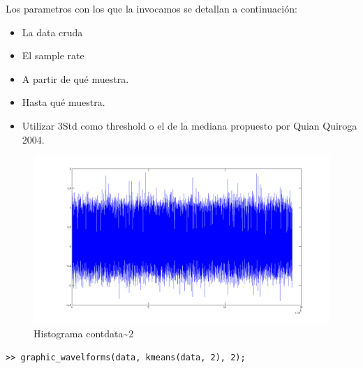 \documentclass[a4paper,spanish]{article}
\begin{document}
Los parametros con los que la invocamos se detallan a continuaci\'on:
\begin{itemize}
	\item La data cruda
	\item El sample rate
	\item A partir de qu\'e muestra.
	\item Hasta qu\'e muestra.
	\item Utilizar 3Std como threshold o el de la mediana propuesto por Quian Quiroga 2004.
\end{itemize}

\begin{figure}[htc]
	\centering
	\includegraphics[width=1.0\textwidth]{imgs/raw_cont_data.png}
	\caption{Histograma contdata\sim2}
	\label{fig5}
\end{figure}

\begin{verbatim}
>> graphic_wavelforms(data, kmeans(data, 2), 2);

\end{verbatim}
\end{document}
